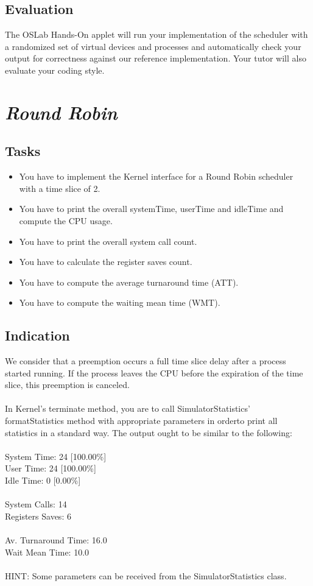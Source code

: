 \documentclass[11pt,a4paper]{scrreprt}
\begin{document}
\subsection{Evaluation}
The OSLab Hands-On applet will run your implementation of the scheduler with a randomized set of virtual devices and processes and automatically check your output for correctness against our reference implementation. Your tutor will also evaluate your coding style.

\section{\textit{Round Robin}}
\subsection{Tasks}
\begin{itemize}
\item You have to implement the Kernel interface for a Round Robin scheduler with a time slice of 2.
\item You have to print the overall systemTime, userTime and idleTime and compute the CPU usage.
\item You have to print the overall system call count.
\item You have to calculate the register saves count.
\item You have to compute the average turnaround time (ATT).
\item You have to compute the waiting mean time (WMT).
\end{itemize}

\subsection{Indication}
We consider that a preemption occurs a full time slice delay after a process started running. If the process leaves the CPU before the expiration of the time slice, this preemption is canceled.\\\\
In Kernel's terminate method, you are to call SimulatorStatistics' formatStatistics method with appropriate parameters in orderto print all statistics in a standard way. The output ought to be similar to the following:\\\\
System Time: 24 [100.00\%]\\
User Time: 24 [100.00\%]\\
Idle Time: 0 [0.00\%]\\\\
System Calls: 14\\
Registers Saves: 6\\\\
Av. Turnaround Time: 16.0\\
Wait Mean Time: 10.0\\\\
HINT: Some parameters can be received from the SimulatorStatistics class.
\end{document}
